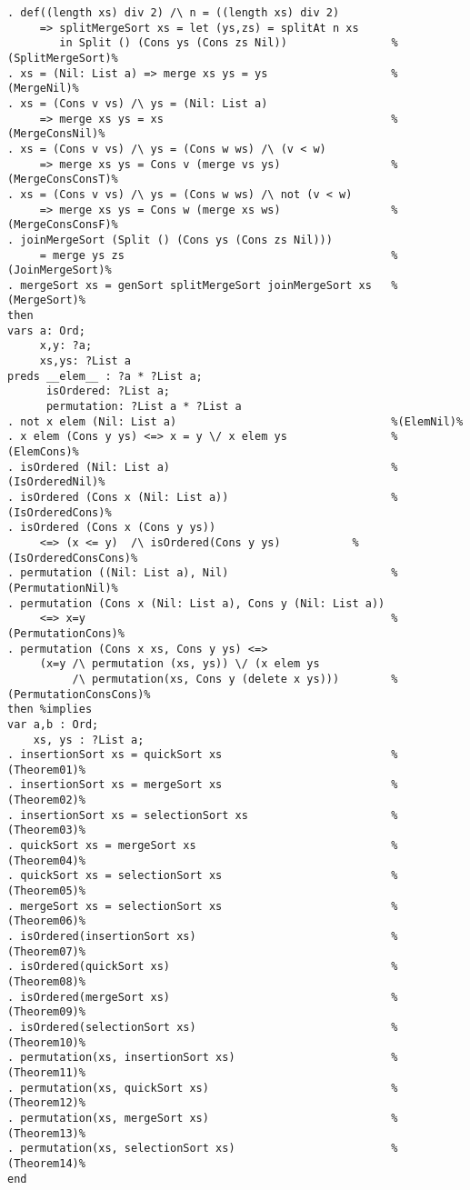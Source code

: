 \begin{Verbatim}
. def((length xs) div 2) /\ n = ((length xs) div 2) 
     => splitMergeSort xs = let (ys,zs) = splitAt n xs
        in Split () (Cons ys (Cons zs Nil))                %(SplitMergeSort)%
. xs = (Nil: List a) => merge xs ys = ys                   %(MergeNil)%
. xs = (Cons v vs) /\ ys = (Nil: List a) 
     => merge xs ys = xs                                   %(MergeConsNil)%
. xs = (Cons v vs) /\ ys = (Cons w ws) /\ (v < w)  
     => merge xs ys = Cons v (merge vs ys)                 %(MergeConsConsT)%
. xs = (Cons v vs) /\ ys = (Cons w ws) /\ not (v < w) 
     => merge xs ys = Cons w (merge xs ws)                 %(MergeConsConsF)%
. joinMergeSort (Split () (Cons ys (Cons zs Nil))) 
     = merge ys zs                                         %(JoinMergeSort)%
. mergeSort xs = genSort splitMergeSort joinMergeSort xs   %(MergeSort)%
then
vars a: Ord;
     x,y: ?a;
     xs,ys: ?List a
preds __elem__ : ?a * ?List a;
      isOrdered: ?List a;
      permutation: ?List a * ?List a
. not x elem (Nil: List a)                                 %(ElemNil)%
. x elem (Cons y ys) <=> x = y \/ x elem ys                %(ElemCons)%
. isOrdered (Nil: List a)                                  %(IsOrderedNil)%
. isOrdered (Cons x (Nil: List a))                         %(IsOrderedCons)%
. isOrdered (Cons x (Cons y ys)) 
     <=> (x <= y)  /\ isOrdered(Cons y ys)           %(IsOrderedConsCons)%
. permutation ((Nil: List a), Nil)                         %(PermutationNil)%
. permutation (Cons x (Nil: List a), Cons y (Nil: List a))
     <=> x=y                                               %(PermutationCons)%
. permutation (Cons x xs, Cons y ys) <=>
     (x=y /\ permutation (xs, ys)) \/ (x elem ys
          /\ permutation(xs, Cons y (delete x ys)))        %(PermutationConsCons)%
then %implies
var a,b : Ord;
    xs, ys : ?List a;
. insertionSort xs = quickSort xs                          %(Theorem01)%
. insertionSort xs = mergeSort xs                          %(Theorem02)%
. insertionSort xs = selectionSort xs                      %(Theorem03)%
. quickSort xs = mergeSort xs                              %(Theorem04)%
. quickSort xs = selectionSort xs                          %(Theorem05)%
. mergeSort xs = selectionSort xs                          %(Theorem06)%
. isOrdered(insertionSort xs)                              %(Theorem07)%
. isOrdered(quickSort xs)                                  %(Theorem08)%
. isOrdered(mergeSort xs)                                  %(Theorem09)%
. isOrdered(selectionSort xs)                              %(Theorem10)%
. permutation(xs, insertionSort xs)                        %(Theorem11)%
. permutation(xs, quickSort xs)                            %(Theorem12)%
. permutation(xs, mergeSort xs)                            %(Theorem13)%
. permutation(xs, selectionSort xs)                        %(Theorem14)%
end
\end{Verbatim}